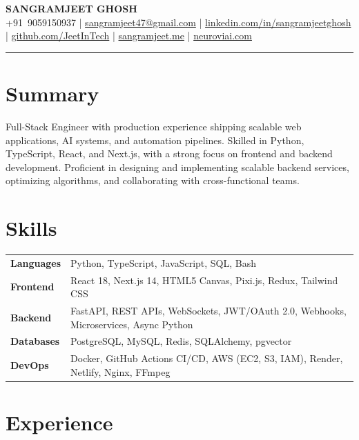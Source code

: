\documentclass[9.5pt]{article}
\begin{document}
\begin{center}
  {\large \textbf{SANGRAMJEET GHOSH}} \\[2pt]
  {\small
    +91~9059150937 \;|\;
    \href{mailto:sangramjeet47@gmail.com}{sangramjeet47@gmail.com} \;|\;
    \href{https://www.linkedin.com/in/sangramjeetghosh}{linkedin.com/in/sangramjeetghosh} \;|\;
    \href{https://github.com/JeetInTech}{github.com/JeetInTech} \;|\;
    \href{https://sangramjeet.me}{sangramjeet.me} \;|\;
    \href{https://neuroviai.com}{neuroviai.com}
  }
\end{center}

\vspace{-2pt}
\noindent\rule{\textwidth}{0.4pt}
\vspace{-4pt}

\section*{Summary}
Full-Stack Engineer with production experience shipping scalable web applications, AI systems, and automation pipelines. Skilled in Python, TypeScript, React, and Next.js, with a strong focus on frontend and backend development. Proficient in designing and implementing scalable backend services, optimizing algorithms, and collaborating with cross-functional teams.

\section*{Skills}
\begin{tabularx}{\textwidth}{@{} p{1.9cm} X @{}}
\textbf{Languages}  & Python, TypeScript, JavaScript, SQL, Bash \\[1pt]
\textbf{Frontend}    & React 18, Next.js 14, HTML5 Canvas, Pixi.js, Redux, Tailwind CSS \\[1pt]
\textbf{Backend}     & FastAPI, REST APIs, WebSockets, JWT/OAuth 2.0, Webhooks, Microservices, Async Python \\[1pt]
\textbf{Databases}   & PostgreSQL, MySQL, Redis, SQLAlchemy, pgvector \\[1pt]
\textbf{DevOps}       & Docker, GitHub Actions CI/CD, AWS (EC2, S3, IAM), Render, Netlify, Nginx, FFmpeg \\
\end{tabularx}

\section*{Experience}
\end{document}

